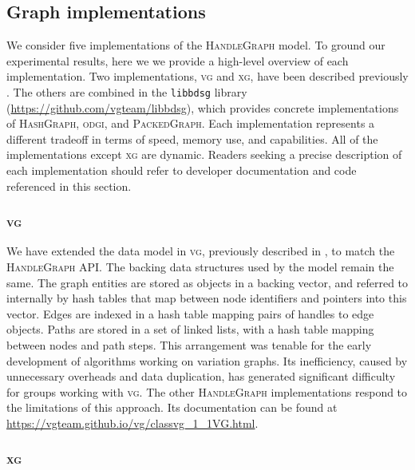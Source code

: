 \documentclass{article}
\begin{document}


\subsection{Graph implementations}

We consider five implementations of the \textsc{HandleGraph} model.
To ground our experimental results, here we we provide a high-level overview of each implementation.
Two implementations, \textsc{vg} and \textsc{xg}, have been described previously \cite{Garrison_2018,Garrison_2019}.
The others are combined in the \texttt{libbdsg} library (\url{https://github.com/vgteam/libbdsg}), which provides concrete implementations of \textsc{HashGraph}, \textsc{odgi}, and \textsc{PackedGraph}.
Each implementation represents a different tradeoff in terms of speed, memory use, and capabilities.
All of the implementations except \textsc{xg} are dynamic.
Readers seeking a precise description of each implementation should refer to developer documentation and code referenced in this section.

\subsubsection{\textsc{vg}}

We have extended the data model in \textsc{vg}, previously described in \cite{Garrison_2018}, to match the \textsc{HandleGraph} API.
The backing data structures used by the model remain the same.
The graph entities are stored as objects in a backing vector, and referred to internally by hash tables that map between node identifiers and pointers into this vector.
Edges are indexed in a hash table mapping pairs of handles to edge objects.
Paths are stored in a set of linked lists, with a hash table mapping between nodes and path steps.
This arrangement was tenable for the early development of algorithms working on variation graphs.
Its inefficiency, caused by unnecessary overheads and data duplication, has generated significant difficulty for groups working with \textsc{vg}.
The other \textsc{HandleGraph} implementations respond to the limitations of this approach.
Its documentation can be found at \url{https://vgteam.github.io/vg/classvg_1_1VG.html}.

\subsubsection{\textsc{xg}}
\end{document}
